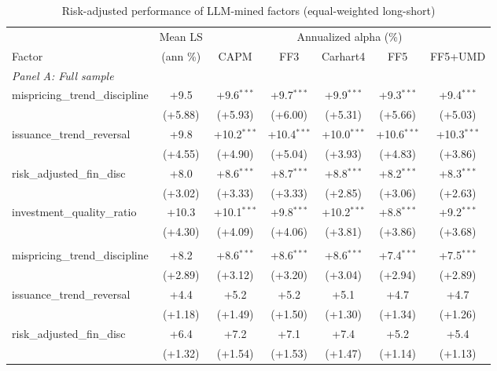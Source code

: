 \begin{table}[htbp]\centering
\caption{Risk-adjusted performance of LLM-mined factors (equal-weighted long-short)}
\label{tab:alphas_ew}
\begin{threeparttable}\footnotesize
\begin{tabular}{lcccccc}
\toprule
 & Mean LS & \multicolumn{5}{c}{Annualized alpha (\%)} \\
\cmidrule(lr){3-7}
Factor & (ann \%) & CAPM & FF3 & Carhart4 & FF5 & FF5+UMD \\
\midrule
\multicolumn{7}{l}{\textit{Panel A: Full sample}} \\
\addlinespace
mispricing\_trend\_discipline & +9.5 & +9.6$^{***}$ & +9.7$^{***}$ & +9.9$^{***}$ & +9.3$^{***}$ & +9.4$^{***}$ \\
 & (+5.88) & (+5.93) & (+6.00) & (+5.31) & (+5.66) & (+5.03) \\
\addlinespace
issuance\_trend\_reversal & +9.8 & +10.2$^{***}$ & +10.4$^{***}$ & +10.0$^{***}$ & +10.6$^{***}$ & +10.3$^{***}$ \\
 & (+4.55) & (+4.90) & (+5.04) & (+3.93) & (+4.83) & (+3.86) \\
\addlinespace
risk\_adjusted\_fin\_disc & +8.0 & +8.6$^{***}$ & +8.7$^{***}$ & +8.8$^{***}$ & +8.2$^{***}$ & +8.3$^{***}$ \\
 & (+3.02) & (+3.33) & (+3.33) & (+2.85) & (+3.06) & (+2.63) \\
\addlinespace
investment\_quality\_ratio & +10.3 & +10.1$^{***}$ & +9.8$^{***}$ & +10.2$^{***}$ & +8.8$^{***}$ & +9.2$^{***}$ \\
 & (+4.30) & (+4.09) & (+4.06) & (+3.81) & (+3.86) & (+3.68) \\
\addlinespace
\midrule
\multicolumn{7}{l}{\textit{Panel B: Out-of-sample (post-2000-12-31)}} \\
\addlinespace
mispricing\_trend\_discipline & +8.2 & +8.6$^{***}$ & +8.6$^{***}$ & +8.6$^{***}$ & +7.4$^{***}$ & +7.5$^{***}$ \\
 & (+2.89) & (+3.12) & (+3.20) & (+3.04) & (+2.94) & (+2.89) \\
\addlinespace
issuance\_trend\_reversal & +4.4 & +5.2 & +5.2 & +5.1 & +4.7 & +4.7 \\
 & (+1.18) & (+1.49) & (+1.50) & (+1.30) & (+1.34) & (+1.26) \\
\addlinespace
risk\_adjusted\_fin\_disc & +6.4 & +7.2 & +7.1 & +7.4 & +5.2 & +5.4 \\
 & (+1.32) & (+1.54) & (+1.53) & (+1.47) & (+1.14) & (+1.13) \\

\end{tabular}
\end{threeparttable}
\end{table}
